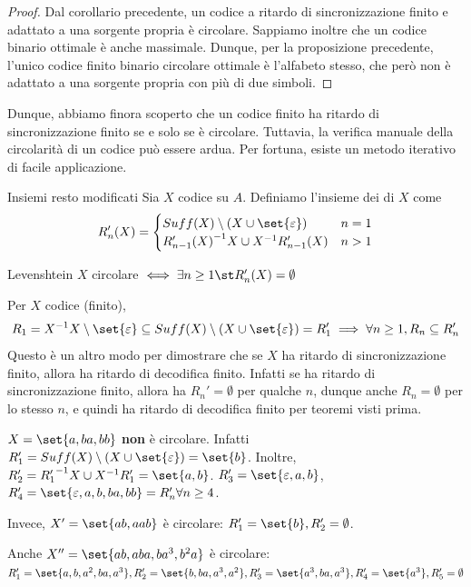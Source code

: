 \begin{proof}
  Dal corollario precedente, un codice a ritardo di sincronizzazione finito e adattato a una sorgente propria è circolare.
  Sappiamo inoltre che un codice binario ottimale è anche massimale.
  Dunque, per la proposizione precedente, l'unico codice finito binario circolare ottimale è l'alfabeto stesso, che però non è adattato a una sorgente propria con più di due simboli.
\end{proof}

Dunque, abbiamo finora scoperto che un codice finito ha ritardo di sincronizzazione finito se e solo se è circolare. Tuttavia, la verifica manuale della circolarità di un codice può essere ardua. Per fortuna, esiste un metodo iterativo di facile applicazione.

\begin{definition}{Insiemi resto modificati}
  Sia \(X\) codice su \(A\). Definiamo l'insieme dei  di \(X\) come
  \begin{equation*}
    R_n'(X) = \begin{cases}
    Suff(X)\setminus (X \cup \set{\varepsilon}) & n = 1\\
    {R_{n-1}'(X)}^{-1}X \cup X^{-1}R_{n-1}'(X) & n > 1
    \end{cases}
  \end{equation*}
\end{definition}

\begin{theorem}{Levenshtein}
  \(X\) circolare \(\iff \exists n \geq 1 \st R_n'(X) = \emptyset\)
\end{theorem}

\begin{observation}{}
  Per \(X\) codice (finito),
  \[R_1 = X^{-1}X\setminus \set{\varepsilon} \subseteq Suff(X) \setminus (X \cup \set{\varepsilon}) = R_1' \implies \forall n \geq 1, R_n \subseteq R_n'\]
  Questo è un altro modo per dimostrare che se \(X\) ha ritardo di sincronizzazione finito, allora ha ritardo di decodifica finito.
  Infatti se ha ritardo di sincronizzazione finito, allora ha \(R_n' = \emptyset\) per qualche \(n\), dunque anche \(R_n = \emptyset\) per lo stesso \(n\), e quindi ha ritardo di decodifica finito per teoremi visti prima.
\end{observation}

\begin{example}{}
  \(X = \set{a,ba,bb}\) \textbf{non} è circolare.
  Infatti \(R_1' = Suff(X) \setminus (X \cup \set{\varepsilon}) = \set{b}\).
  Inoltre, \(R_2' = {R_1'}^{-1}X \cup X^{-1}R_1' = \set{a,b}\).
  \(R_3' = \set{\varepsilon, a ,b}\),\(R_4' = \set{\varepsilon, a ,b, ba,bb} = R_n' \forall n \geq 4\).

  Invece, \(X' = \set{ab,aab}\) è circolare: \(R_1' = \set{b}, R'_2 = \emptyset\).
  
  Anche \(X'' = \set{ab,aba,ba^3,b^2a}\) è circolare:
  \(R_1' = \set{a,b,a^2,ba,a^3}, R_2' = \set{b,ba,a^3,a^2}, R_3' = \set{a^3,ba,a^3}, R_4' = \set{a^3}, R_5' = \emptyset\)
\end{example}

